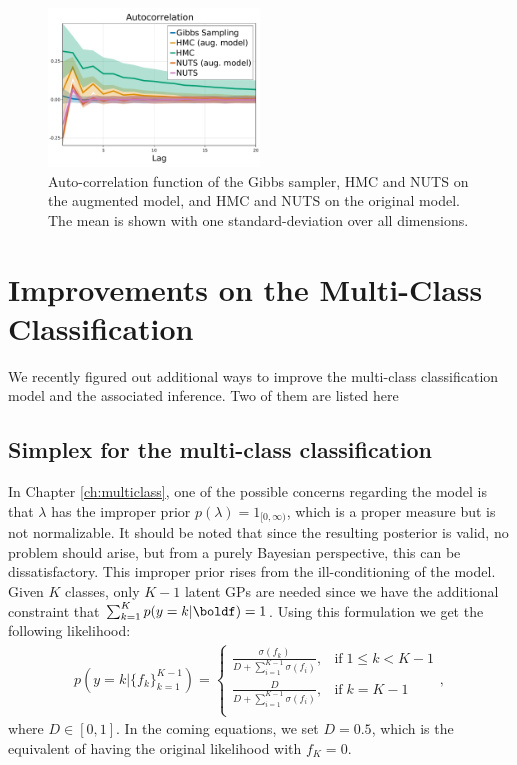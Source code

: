 \begin{figure}
    \centering
    \includegraphics[width=0.5\textwidth]{./chapters/8_discussions/figures/autocorrelation.pdf}
    \caption{Auto-correlation function of the Gibbs sampler, \ac{HMC} and \ac{NUTS} on the augmented model, and \ac{HMC} and \ac{NUTS} on the original model.
    The mean is shown with one standard-deviation over all dimensions.}
    \label{fig:hmc_vs_gibbs}
\end{figure}


\section{Improvements on the Multi-Class Classification}
\label{sec:improvemulticlass}
We recently figured out additional ways to improve the multi-class classification model and the associated inference.
Two of them are listed here

\subsection{Simplex for the multi-class classification}
\label{sec:simplex}
In Chapter \ref{ch:multiclass}, one of the possible concerns regarding the model is that $\lambda$ has the improper prior $p(\lambda) = 1_{[0,\infty)}$, which is a proper measure but is not normalizable.
It should be noted that since the resulting posterior is valid, no problem should arise, but from a purely Bayesian perspective, this can be dissatisfactory.
This improper prior rises from the ill-conditioning of the model.
Given $K$ classes, only $K-1$ latent \ac{GPs} are needed since we have the additional constraint that $\sum_{k=1}^K p(y=k|\boldf) = 1$.
Using this formulation we get the following likelihood:
\begin{align}
    p(y=k|\{f_k\}_{k=1}^{K-1}) = \left\{
        \begin{array}{cc}
            \frac{\sigma(f_k)}{D + \sum_{i=1}^{K-1}\sigma(f_i)}, & \mathrm{if}\; 1 \leq k < K - 1\\
            \frac{D}{D + \sum_{i=1}^{K-1}\sigma(f_i)}, & \mathrm{if}\; k = K - 1 \\
    \end{array}
    \right.,
\end{align}
where $D \in [0, 1]$.
In the coming equations, we set $D=0.5$, which is the equivalent of having the original likelihood with $f_K = 0$.

